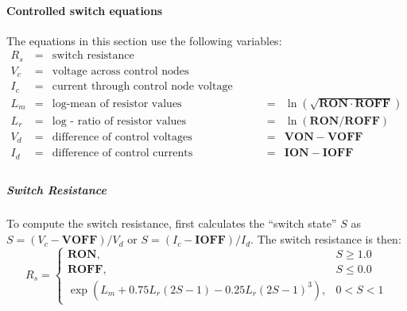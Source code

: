 \paragraph{Controlled switch equations}
The equations in this section use the following variables:
\[
\begin{array}{rllll}
R_s & = & \mbox{switch resistance} \\
V_c & = & \mbox{voltage across control nodes} \\
I_c & = & \mbox{current through control node voltage source} \\
L_m & = & \mbox{log-mean of resistor values} & = &
\ln \left(\sqrt{\mathbf{RON \cdot ROFF}} \right) \\
L_r & = & \mbox{log - ratio of resistor values} & = &
\ln \left(\mathbf{RON / ROFF} \right) \\
V_d & = & \mbox{difference of control voltages} & = & \mathbf{VON - VOFF} \\
I_d & = & \mbox{difference of control currents} & = & \mathbf{ION - IOFF} \\
\end{array}
\]

\subparagraph{Switch Resistance}

To compute the switch resistance, \Xyce{} first calculates the
``switch state'' $S$ as $S=(V_c-\mathbf{VOFF})/V_d$ or
$S=(I_c-\mathbf{IOFF})/I_d$.  The switch resistance is then:
\[ R_s = \left\{ \begin{array}{ll}
\mathbf{RON}, & S \geq 1.0 \\
\mathbf{ROFF}, & S \leq 0.0 \\
\exp \left(L_m + 0.75L_r(2S-1) - 0.25L_r(2S-1)^3 \right),
& 0< S < 1
\end{array}
\right.
\]

